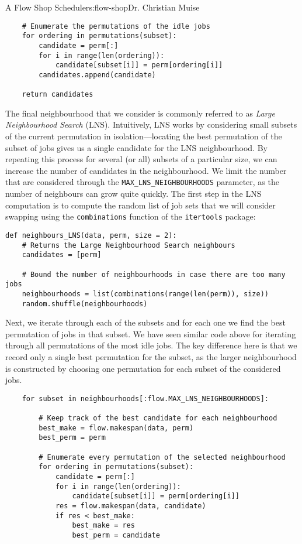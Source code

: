 \begin{aosachapter}{A Flow Shop Scheduler}{s:flow-shop}{Dr. Christian Muise}
\begin{verbatim}
    # Enumerate the permutations of the idle jobs
    for ordering in permutations(subset):
        candidate = perm[:]
        for i in range(len(ordering)):
            candidate[subset[i]] = perm[ordering[i]]
        candidates.append(candidate)

    return candidates
\end{verbatim}

The final neighbourhood that we consider is commonly referred to as
\emph{Large Neighbourhood Search} (LNS). Intuitively, LNS works by
considering small subsets of the current permutation in
isolation---locating the best permutation of the subset of jobs gives us
a single candidate for the LNS neighbourhood. By repeating this process
for several (or all) subsets of a particular size, we can increase the
number of candidates in the neighbourhood. We limit the number that are
considered through the \texttt{MAX\_LNS\_NEIGHBOURHOODS} parameter, as
the number of neighbours can grow quite quickly. The first step in the
LNS computation is to compute the random list of job sets that we will
consider swapping using the \texttt{combinations} function of the
\texttt{itertools} package:

\begin{verbatim}
def neighbours_LNS(data, perm, size = 2):
    # Returns the Large Neighbourhood Search neighbours
    candidates = [perm]

    # Bound the number of neighbourhoods in case there are too many jobs
    neighbourhoods = list(combinations(range(len(perm)), size))
    random.shuffle(neighbourhoods)
\end{verbatim}

Next, we iterate through each of the subsets and for each one we find
the best permutation of jobs in that subset. We have seen similar code
above for iterating through all permutations of the most idle jobs. The
key difference here is that we record only a single best permutation for
the subset, as the larger neighbourhood is constructed by choosing one
permutation for each subset of the considered jobs.

\begin{verbatim}
    for subset in neighbourhoods[:flow.MAX_LNS_NEIGHBOURHOODS]:

        # Keep track of the best candidate for each neighbourhood
        best_make = flow.makespan(data, perm)
        best_perm = perm

        # Enumerate every permutation of the selected neighbourhood
        for ordering in permutations(subset):
            candidate = perm[:]
            for i in range(len(ordering)):
                candidate[subset[i]] = perm[ordering[i]]
            res = flow.makespan(data, candidate)
            if res < best_make:
                best_make = res
                best_perm = candidate


\end{verbatim}
\end{aosachapter}
